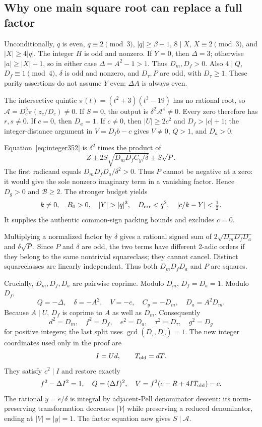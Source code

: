 \subsection{Why one main square root can replace a full factor}
Unconditionally, $q$ is even, $q\equiv2\pmod3$, $|q|\ge\beta-1$,
$8\mid X$, $X\equiv2\pmod3$, and $|X|\ge4|q|$.
The integer $H$ is odd and nonzero. If $Y=0$, then $\Delta=3$;
otherwise $|a|\ge|X|-1$, so in either case $\Delta=A^2-1>1$.
Thus $D_m,D_f>0$. Also $4\mid Q$, $D_f\equiv1\pmod4$,
$\delta$ is odd and nonzero, and $D_\tau,P$ are odd, with $D_\tau\ge1$.
These parity assertions do not assume $Y$ even: $\Delta A$ is always even.

The intersective quintic $\pi(t)=(t^2+3)(t^3-19)$ has no rational root,
so $\mathcal A=D_c^5\pi(z_c/D_c)\ne0$. If $S=0$, the output is
$\delta^2\mathcal A^4\ne0$. Every zero therefore has $r,s\ne0$.
If $c=0$, then $D_a=1$. If $c\ne0$, then $|U|\ge2c^2$ and
$D_f>|c|+1$; the integer-distance argument in
$V=D_fb-c$ gives $V\ne0$, $Q>1$, and $D_a>0$.

Equation~\eqref{eq:integer352} is $\delta^2$ times the product of
\[
 Z\pm2S\sqrt{D_mD_fC_y/\delta}\pm S\sqrt P.
\]
The first radicand equals $D_mD_fD_a/\delta^2>0$.
Thus $P$ cannot be negative at a zero: it would give the sole nonzero
imaginary term in a vanishing factor. Hence $D_g>0$ and $\mathcal B\ge2$.
The stronger budget yields
\[
 k\ne0,\quad B_0>0,\quad |Y|>|q|^3,\quad
 D_{\rm err}<q^2,\quad |c/k-Y|<\tfrac12.
\]
It supplies the authentic common-sign packing bounds and excludes $c=0$.

Multiplying a normalized factor by $\delta$ gives a rational signed sum
of $2\sqrt{D_mD_fD_a}$ and $\delta\sqrt P$.
Since $P$ and $\delta$ are odd, the two terms have different 2-adic
orders if they belong to the same nontrivial squareclass; they cannot
cancel. Distinct squareclasses are linearly independent. Thus both
$D_mD_fD_a$ and $P$ are squares.

Crucially, $D_m,D_f,D_a$ are pairwise coprime. Modulo $D_m$,
$D_f=D_a=1$. Modulo $D_f$,
\[
 Q=-\Delta,\quad\delta=-A^2,\quad V=-c,\quad C_y=-D_m,
 \quad D_a=A^2D_m.
\]
Because $A\mid U$, $D_f$ is coprime to $A$ as well as $D_m$.
Consequently
\[
 d^2=D_m,\quad f^2=D_f,\quad e^2=D_a,\quad
 \tau^2=D_\tau,\quad g^2=D_g
\]
for positive integers; the last split uses $\gcd(D_\tau,D_g)=1$.
The new integer coordinates used only in the proof are
\[
 I=Ud,\qquad T_{\rm old}=dT.
\]
They satisfy $c^2\mid I$ and restore exactly
\[
 f^2-\Delta I^2=1,\quad Q=(\Delta I)^2,\quad
 V=f^2(c-R+4IT_{\rm old})-c.
\]
The rational $y=e/\delta$ is integral by adjacent-Pell denominator
descent: its norm-preserving transformation decreases $|V|$ while
preserving a reduced denominator, ending at $|V|=|y|=1$.
The factor equation now gives $S\mid\mathcal A$.

